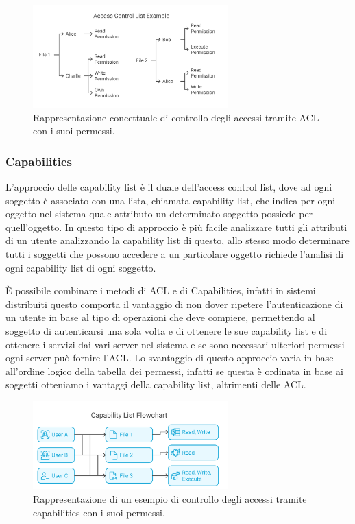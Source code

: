              \begin{figure}[H]
                \centering
                \includegraphics[width=0.67\textwidth]{Immagini/access-control-list.png}
                \caption{Rappresentazione concettuale di controllo degli accessi tramite ACL con i suoi permessi.}
                \label{fig:acl_pic}
            \end{figure}
             
        \subsubsection{Capabilities}
            L'approccio delle capability list è il duale dell'access control list, dove ad ogni soggetto è associato con una lista, chiamata  capability list, che indica per ogni oggetto nel sistema quale attributo un determinato soggetto possiede per quell'oggetto. In questo tipo di approccio è più facile analizzare tutti gli attributi di un utente analizzando la  capability list di questo, allo stesso modo determinare tutti i soggetti che possono accedere a un particolare oggetto richiede l'analisi di ogni capability list di ogni soggetto.

            È possibile combinare i metodi di ACL e di Capabilities, infatti in sistemi distribuiti questo comporta il vantaggio di non dover ripetere l'autenticazione di un utente in base al tipo di operazioni che deve compiere, permettendo al soggetto di autenticarsi una sola volta e di ottenere le sue capability list e di ottenere i servizi dai vari server nel sistema e se sono necessari ulteriori permessi ogni server può fornire l'ACL. Lo svantaggio di questo approccio varia in base all'ordine logico della tabella dei permessi, infatti se questa è ordinata in base ai soggetti otteniamo i vantaggi della capability list, altrimenti delle ACL.

            \begin{figure}[H]
                \centering
                \includegraphics[width=0.67\textwidth]{Immagini/capability_list.png}
                \caption{Rappresentazione di un esempio di controllo degli accessi tramite capabilities con i suoi permessi.}
                \label{fig:cap_pic}
            \end{figure}
            
